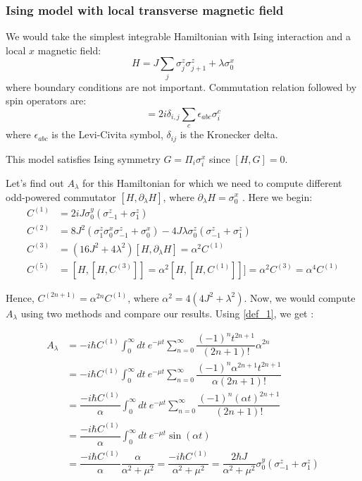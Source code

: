 \documentclass[11pt,a4paper]{article}
\begin{document}
\subsubsection*{Ising model with local transverse magnetic field}
We would take the simplest integrable Hamiltonian with Ising interaction and a local $x$ magnetic field:
\begin{equation}
H= J \sum_{j}  \sigma_j^z \sigma_{j+1}^z +  \lambda  \sigma_0^x
\label{zz}
\end{equation}
where boundary conditions are not important. Commutation relation followed by spin operators are:
\begin{equation}
[\sigma_i^a, \sigma_{j}^b]= 2 i   \delta_{i,j} \sum_c  \epsilon_{a b c} \sigma_i^c
\end{equation}
where $\epsilon_{abc}$ is the Levi-Civita symbol, $ \delta_{ij}$ is the Kronecker delta.

This model satisfies Ising symmetry $G= \Pi_i \sigma_i^x$ since $[H, G]=0$.


Let's find out $A_{\lambda}$ for this Hamiltonian for which we need to compute different odd-powered commutator $[H, \partial_{\lambda} H]$, where $\partial_{\lambda} H=\sigma_0^x$ . Here we begin:
\begin{align}
C^{(1)}&= 2 i J \sigma_0^y ( \sigma_{-1}^z + \sigma_1^z) \\ 
C^{(2)}&= 8 J^2(\sigma^z_1 \sigma^x_0 \sigma^z_{-1} + \sigma^x_0) - 4J \lambda \sigma_0^z( \sigma_{-1}^z + \sigma_1^z) \\
C^{(3)} &=  (16 J^2 + 4 \lambda ^2) [H, \partial_{\lambda} H] = \alpha^2  C^{(1)} \\
C^{(5)}&=[H,[H, C^{(3)}]]  = \alpha^2 [H, [H,C^{(1)}]]]=\alpha^2 C^{(3)}=  \alpha^4 C^{(1)}   
\end{align}


Hence, $C^{(2n+1)}= \alpha^{2n} C^{(1)}$, where $\alpha^2= 4 (4 J^2 +  \lambda ^2) $. Now, we would compute $A_{\lambda}$ using two methods and compare our results. Using \ref{def_1}, we get :

\begin{align*}
A_{\lambda} &= -i \hbar    C^{(1)} \int_0^{\infty} dt\ e^{-\mu t} \sum_{n=0}^{\infty} \dfrac{(-1)^{n} t ^{2n+1}}{(2n+1)!}  \alpha^{2n}  \\
 &= -i \hbar    C^{(1)} \int_0^{\infty} dt\ e^{-\mu t} \sum_{n=0}^{\infty} \dfrac{(-1)^{n}  \alpha^{2n+1} t ^{2n+1}}{\alpha(2n+1)!}   \\
  &= \dfrac{-i \hbar    C^{(1)}}{\alpha} \int_0^{\infty} dt\ e^{-\mu t} \sum_{n=0}^{\infty} \dfrac{(-1)^{n}  (\alpha t)^{2n+1}}{(2n+1)!}   \\
    &= \dfrac{-i \hbar    C^{(1)}}{\alpha} \int_0^{\infty} dt\ e^{-\mu t}  \sin  (\alpha t)   \\
     &= \dfrac{-i \hbar    C^{(1)}}{\alpha} \dfrac{\alpha}{\alpha^2 + \mu^2} =\dfrac{-i \hbar    C^{(1)}}{{\alpha^2 + \mu^2}} =  \dfrac{2 \hbar J}{{\alpha^2 + \mu^2}} \sigma_0^y ( \sigma_{-1}^z + \sigma_1^z) 
\end{align*}
 
\end{document}
